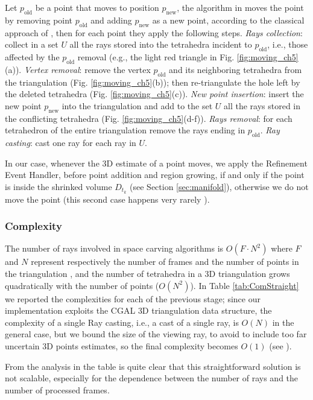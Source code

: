 Let $p_{\text{old}}$ be a point that moves to position $p_{\text{new}}$, the algorithm in \cite{Lovi_et_al_11} moves the point by removing point $p_{\text{old}}$ and adding $p_{\text{new}}$ as a new point, according to the classical approach of \cite{Devillers03}, then for each point they apply the following steps. \emph{Rays collection}: collect in a set $U$ all the rays stored into the tetrahedra incident to $p_{\text{old}}$, i.e., those affected by the $p_{\text{old}}$ removal (e.g., the light red triangle in Fig. \ref{fig:moving_ch5}(a)). \emph{Vertex removal}: remove the vertex $p_{\text{old}}$ and its neighboring tetrahedra from the triangulation (Fig. \ref{fig:moving_ch5}(b)); then re-triangulate the hole left by the deleted tetrahedra (Fig. \ref{fig:moving_ch5}(c)). \emph{New point insertion}: insert the new point $p_{\text{new}}$ into the triangulation and add to the set $U$ all the rays stored in the conflicting tetrahedra (Fig. \ref{fig:moving_ch5}(d-f)). \emph{Rays removal}: for each tetrahedron of the entire triangulation remove the rays ending in $p_{\text{old}}$. \emph{Ray casting}: cast one ray for each ray in $U$.

In our case, whenever the 3D estimate of a point moves, we apply the Refinement Event Handler, before point addition and region growing, if and only if the point is inside the shrinked volume $D_{t_k}$ (see Section \ref{sec:manifold}), otherwise we do not move the point (this second case happens very rarely \cite{litvinov_lhuillier_13}).
\subsubsection{Complexity}
The number of rays involved in space carving algorithms is $O(F\cdot N^2)$ where $F$ and $N$ represent respectively the number of frames and the number of points in the triangulation \cite{Lovi_et_al_11}, and the number of tetrahedra in a 3D triangulation grows quadratically with the number of points ($O(N^2)$). 
In Table \ref{tab:ComStraight} we reported the complexities for each of the previous stage; since our implementation exploits the CGAL \cite{cgal} 3D triangulation data structure, the complexity of a single Ray casting, i.e., a cast of a single ray, is $O(N)$ in the general case, but we bound the size of the viewing ray, to avoid to include too far uncertain 3D points estimates, so the final complexity becomes $O(1)$  (see \cite[p.94]{yu2013automatic}).

From the analysis in the table is quite clear that this straightforward solution is not scalable, especially for the dependence between the number of rays and the number of processed frames. 

